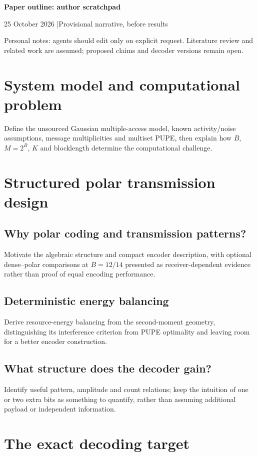 \documentclass[10pt,a4paper]{article}
\begin{document}
{\LARGE\bfseries Paper outline: author scratchpad}\par
{\small 25 October 2026 \quad|\quad Provisional narrative, before results}\par
{\footnotesize Personal notes: agents should edit only on explicit request.
Literature review and related work are assumed; proposed claims and decoder versions remain open.}

\section{System model and computational problem}
Define the unsourced Gaussian multiple-access model, known activity/noise assumptions, message multiplicities and multiset PUPE, then explain how $B$, $M=2^B$, $K$ and blocklength determine the computational challenge.

\section{Structured polar transmission design}

\subsection{Why polar coding and transmission patterns?}
Motivate the algebraic structure and compact encoder description, with optional dense--polar comparisons at $B=12/14$ presented as receiver-dependent evidence rather than proof of equal encoding performance.

\subsection{Deterministic energy balancing}
Derive resource-energy balancing from the second-moment geometry, distinguishing its interference criterion from PUPE optimality and leaving room for a better encoder construction.

\subsection{What structure does the decoder gain?}
Identify useful pattern, amplitude and count relations; keep the intuition of one or two extra bits as something to quantify, rather than assuming additional payload or independent information.

\section{The exact decoding target}
\end{document}
